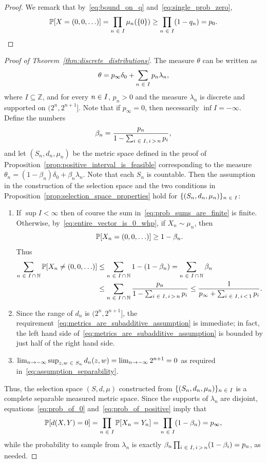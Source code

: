 \documentclass[10pt]{amsart}
\theoremstyle{definition}\newtheorem{defi}[theo]{Definition}\newtheorem{rema}[theo]{Remark}\newtheorem{exam}[theo]{Example}\newtheorem{exem}[theo]{Example}\newtheorem{nota}[theo]{Notation}
\newcommand*\n{\mathbb{N}}
\newcommand*\z{\mathbb{Z}}
\newcommand*\p{\mathbb{P}}
\newcommand*\intersect{\cap}
\let\originalleft\left
\let\originalright\right
\renewcommand{\left}{\mathopen{}\mathclose\bgroup\originalleft}
\renewcommand{\right}{\aftergroup\egroup\originalright}
\renewcommand*{\to}{\mathchoice{\longrightarrow}{\rightarrow}{\rightarrow}{\rightarrow}}
\let\oldin\in
\renewcommand{\in}{\mathchoice{\oldin}{\oldin}{\,\oldin\,}{\,\oldin\,}}
\begin{document}
\begin{proof}
We remark that by~\eqref{eq:bound_on_q} and~\eqref{eq:single_prob_zero},
\begin{equation}\label{eq:entire_vector_is_0_whp}
\p\left[X=\left(0,0,\ldots\right)\right]=\prod_{n\in I}\mu_{n}\left(\left\{ 0\right\} \right)\geq\prod_{n\in I}\left(1-q_{n}\right)=p_{0}.\qedhere
\end{equation}
\end{proof}
\begin{proof}[Proof of Theorem~\ref{thm:discrete_distributions}]\label{prfTheo1.1}
The measure $\theta$ can be written as
\[
\theta=p_{\infty}\delta_{0}+\sum_{n\in I}p_{n}\lambda_{n},
\]
where $I\subseteq\z$, and for every $n\in I$, $p_{n}>0$ and the measure $\lambda_{n}$ is discrete and supported on $(2^{n},2^{n+1}]$. Note that if $p_{\infty}=0$, then necessarily $\inf I=-\infty$. Define the numbers
\[
\beta_{n}=\frac{p_{n}}{1-\sum_{i\in I,\,i\,>\,n}p_{i}},
\]
and let $(S_{n},d_{n},\mu_{n})$ be the metric space defined in the proof of Proposition~\ref{prop:positive_interval_is_feasible} corresponding to the measure $\theta_{n}=(1-\beta_{n})\delta_{0}+\beta_{n}\lambda_{n}$. Note that each $S_{n}$ is countable. Then the assumption in the construction of the selection space and the two conditions in Proposition~\ref{prop:selection_space_properties} hold for $\{(S_{n},d_{n},\mu_{n})\} _{n\in I}$:
\begin{enumerate}
\item If $\sup I<\infty$ then of course the sum in~\eqref{eq:prob_sums_are_finite} is finite. Otherwise, by~\eqref{eq:entire_vector_is_0_whp}, if $X_{n}\sim\mu_{n}$, then
\[
\p\left[X_{n}=\left(0,0,\ldots\right)\right]\geq1-\beta_{n}.
\]
Thus
\begin{align*}
\sum_{n\in I\,\intersect\,\n} \p\left[X_{n}\neq\left(0,0,\ldots\right)\right]&\leq\sum_{n\in I\,\intersect\,\n}1-\left(1-\beta_{n}\right) =\sum_{n\in I\,\intersect\,\n}\beta_{n} \\ &\leq\sum_{n\in I\,\intersect\,\n}\frac{p_{n}}{1-\sum_{i\in I,\,i\,>\,n}p_{i}}\leq\frac{1}{p_{\infty}+\sum_{i\in I,\,i\,<\,1}p_{i}}.
\end{align*}
\item Since the range of $d_{n}$ is $(2^{n},2^{n+1}]$, the requirement~\eqref{eq:metrics_are_subadditive_assumption} is immediate; in fact, the left hand side of~\eqref{eq:metrics_are_subadditive_assumption} is bounded by just half of the right hand side.
\item $\lim_{n\to-\infty}\sup_{z,w\in S_{n}}d_{n}(z,w)=\lim_{n\to-\infty}2^{n+1}=0$ as required in~\eqref{eq:assumption_separability}.
\end{enumerate}
Thus, the selection space $(S,d,\mu)$ constructed from $\{(S_{n},d_{n},\mu_{n})\} _{n\in I}$ is a complete separable measured metric space. Since the supports of $\lambda_{n}$ are disjoint, equations~\eqref{eq:prob_of_0} and~\eqref{eq:prob_of_positive} imply that
\[
\p\left[d\left(X,Y\right)=0\right]=\prod_{n\in I}\p\left[X_{n}=Y_{n}\right]=\prod_{n\in I}\left(1-\beta_{n}\right)=p_{\infty},
\]
while the probability to sample from $\lambda_{n}$ is exactly $\beta_{n}\prod_{i\in I,\,i\,>\,n}(1-\beta_{i})=p_{n}$, as needed.
\end{proof}
\end{document}
